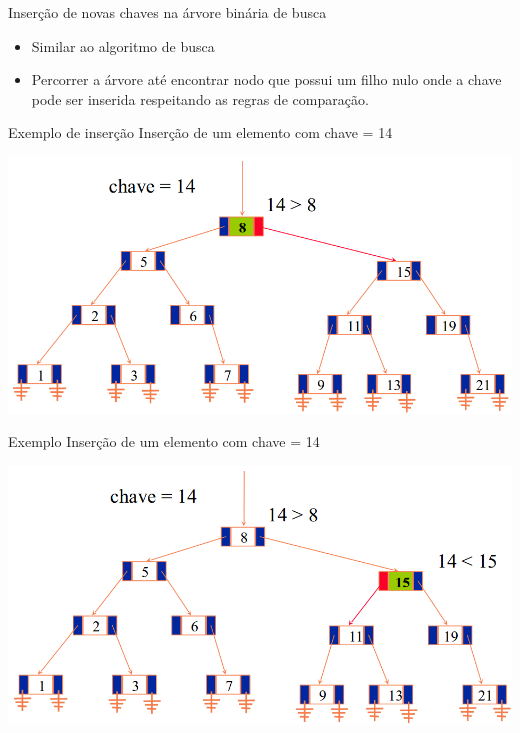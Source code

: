 \documentclass[12pt,table,xcolor={dvipsnames}]{beamer}
\begin{document}
\begin{frame}[fragile]{Inserção de novas chaves na árvore binária de busca}
	\begin{itemize}
	\item Similar ao algoritmo de busca
	\item Percorrer a árvore até encontrar nodo que possui um filho nulo onde a chave pode ser inserida respeitando as regras de comparação.
	\end{itemize}
\end{frame}

\begin{frame}[fragile]{Exemplo de inserção}
Inserção de um elemento com chave = 14
\begin{center}
\includegraphics[scale=.3]{arv2.png} 
\end{center}
\end{frame}

\begin{frame}[fragile]{Exemplo}
Inserção de um elemento com chave = 14
\begin{center}
\includegraphics[scale=.3]{arv3.png} 
\end{center}
\end{frame}
\end{document}
